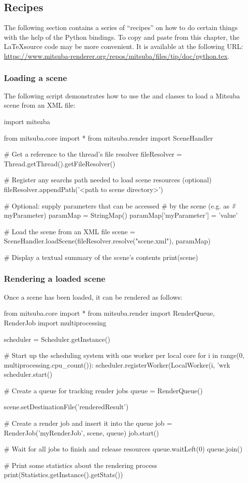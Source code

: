 \subsection{Recipes}
The following section contains a series of ``recipes'' on how to do
certain things with the help of the Python bindings.
To copy and paste from this chapter, the \LaTeX source code may
be more convenient. It is available at the following URL: \url{https://www.mitsuba-renderer.org/repos/mitsuba/files/tip/doc/python.tex}.

\subsubsection{Loading a scene}
The following script demonstrates how to use the
 and  classes to
load a Mitsuba scene from an XML file:
\begin{python}
import mitsuba

from mitsuba.core import *
from mitsuba.render import SceneHandler

# Get a reference to the thread's file resolver
fileResolver = Thread.getThread().getFileResolver()

# Register any searchs path needed to load scene resources (optional)
fileResolver.appendPath('<path to scene directory>')

# Optional: supply parameters that can be accessed
# by the scene (e.g. as $\text{\color{lstcomment}\itshape\texttt{\$}}$myParameter)
paramMap = StringMap()
paramMap['myParameter'] = 'value'

# Load the scene from an XML file
scene = SceneHandler.loadScene(fileResolver.resolve("scene.xml"), paramMap)

# Display a textual summary of the scene's contents
print(scene)
\end{python}

\subsubsection{Rendering a loaded scene}
Once a scene has been loaded, it can be rendered as follows:
\begin{python}
from mitsuba.core import *
from mitsuba.render import RenderQueue, RenderJob
import multiprocessing

scheduler = Scheduler.getInstance()

# Start up the scheduling system with one worker per local core
for i in range(0, multiprocessing.cpu_count()):
    scheduler.registerWorker(LocalWorker(i, 'wrk%
scheduler.start()

# Create a queue for tracking render jobs
queue = RenderQueue()

scene.setDestinationFile('renderedResult')

# Create a render job and insert it into the queue
job = RenderJob('myRenderJob', scene, queue)
job.start()

# Wait for all jobs to finish and release resources
queue.waitLeft(0)
queue.join()

# Print some statistics about the rendering process
print(Statistics.getInstance().getStats())
\end{python}

